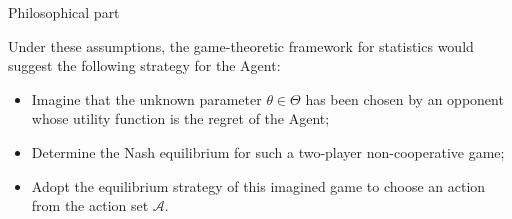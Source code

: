 \documentclass{beamer}
\theoremstyle{definition}
\begin{document}
\begin{frame}{Philosophical part }

Under these assumptions, the game-theoretic framework for statistics would suggest the following strategy for the Agent:

\begin{itemize}
    \item Imagine that the unknown parameter $\theta \in \Theta$ has been chosen by an opponent whose utility function is the regret of the Agent;
    \item Determine the Nash equilibrium for such a two-player non-cooperative game;
    \item Adopt the equilibrium strategy of this imagined game to choose an action from the action set $\mathcal{A}$.
\end{itemize}

\end{frame}
\end{document}
